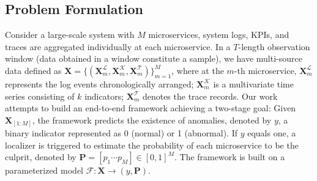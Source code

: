 \subsection{Problem Formulation}\label{sec:prob form}
Consider a large-scale system with $M$ microservices, system logs, KPIs, and traces are aggregated individually at each microservice.
In a $T$-length observation window (data obtained in a window constitute a sample), we have multi-source data defined as $\mathbf{X}=\{ ( \mathbf{X}^\mathcal{L}_{m}, \mathbf{X}^\mathcal{K}_{m}, \mathbf{X}^\mathcal{T}_{m} ) \}_{m=1}^M$, 
where at the $m$-th microservice,
$\mathbf{X}^\mathcal{L}_{m}$ represents the log events chronologically arranged;
$\mathbf{X}^\mathcal{K}_{m}$ is a multivariate time series consisting of $k$ indicators;
$\mathbf{X}^\mathcal{T}_{m}$ denotes the trace records.
Our work attempts to build an end-to-end framework achieving a two-stage goal:
Given $\mathbf{X}_{[1:M]}$, the framework predicts the existence of anomalies, denoted by $y$, a binary indicator represented as 0 (normal) or 1 (abnormal). 
If $y$ equals one, a localizer is triggered to estimate the probability of each microservice to be the culprit, denoted by $\textbf{P}=[p_{1} \cdots p_{M}] \in [0, 1]^M$.
The framework is built on a parameterized model $\mathcal{F}: \mathbf{X} \rightarrow (y, \mathbf{P})$.
